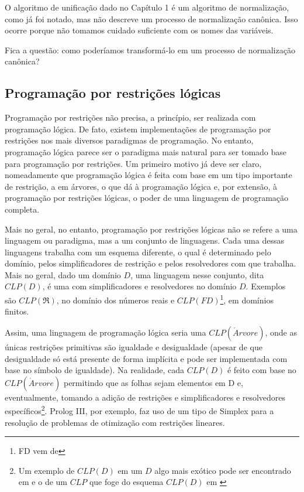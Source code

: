 \documentclass{article}
\begin{document}
O algoritmo de unificação dado no Capítulo 1 %
é um algoritmo de normalização, como já foi notado, mas não descreve
um processo de normalização canônica. Isso ocorre porque não tomamos
cuidado suficiente com os nomes das variáveis.

Fica a questão: como poderíamos transformá-lo em um processo de
normalização canônica?

\subsection{Programação por restrições lógicas}

Programação por restrições não precisa, a princípio, ser realizada com
programação lógica. De fato, existem implementações de programação por
restrições nos mais diversos paradigmas de programação. No entanto,
programação lógica parece ser o paradigma mais natural para ser tomado
base para programação por restrições. Um primeiro motivo já deve ser
claro, nomeadamente que programação lógica é feita com base em um tipo
importante de restrição, a em árvores, o que dá à programação lógica
e, por extensão, à programação por restrições lógicas, o poder de uma
linguagem de programação completa.

Mais no geral, no entanto, programação por restrições lógicas não se
refere a uma linguagem ou paradigma, mas a um conjunto de
linguagens. Cada uma dessas linguagens trabalha com um esquema
diferente, o qual é determinado pelo domínio, pelos simplificadores de
restrição e pelos resolvedores com que trabalha. Mais no geral, dado
um domínio $D$, uma linguagem nesse conjunto, dita $CLP(D)$, é uma com
simplificadores e resolvedores no domínio $D$.  Exemplos são
$CLP(\Re)$, no domínio dos números reais e $CLP(FD)$\footnote{FD vem
  de }, em domínios finitos.

Assim, uma linguagem de programação lógica  seria
uma $CLP(\acute{A}rvore)$, onde as únicas restrições primitivas são
igualdade e desigualdade (apesar de que desigualdade só está presente
de forma implícita e pode ser implementada com base no símbolo de
igualdade).  Na realidade, cada $CLP(D)$ é feito com base no
$CLP(\acute{A}rvore)$ permitindo que as folhas sejam elementos em D e,
eventualmente, tomando a adição de restrições e simplificadores e
resolvedores específicos\footnote{Um exemplo de $CLP(D)$ em um $D$
  algo mais exótico pode ser encontrado em \cite{besik} e o de um
  $CLP$ que foge do esquema $CLP(D)$ em \cite{margarida}}. Prolog III,
por exemplo, faz uso de um tipo de Simplex para a resolução de
problemas de otimização com restrições lineares.
\end{document}
